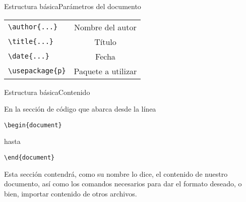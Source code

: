 \documentclass[10pt,xcolor={dvipsnames}]{beamer}
\begin{document}
\begin{frame}{Estructura básica}{Parámetros del documento}
\begin{tabular}{l|c}
	{\tt\textbackslash author\{...\}} & Nombre del autor \\ 
	{\tt\textbackslash title\{...\}} &  Título\\ 
	{\tt\textbackslash date\{...\}} &  Fecha\\ 
	{\tt\textbackslash usepackage\{p\}} &  Paquete a utilizar\\ 
\end{tabular} 
\end{frame}

\begin{frame}{Estructura básica}{Contenido}

En la sección de código que abarca desde la línea\\
\begin{center}
	{\tt\textbackslash begin\{document\}}\\
\end{center}
hasta\\
\begin{center}
	{\tt\textbackslash end\{document\}}\\
\end{center}

Esta sección contendrá, como su nombre lo dice, el contenido de nuestro documento, así como los comandos necesarios para dar el formato deseado, o bien, importar contenido de otros archivos.
\end{frame}

\end{document}
